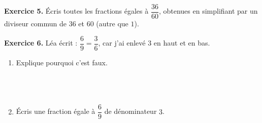 \vfill
{\bfseries\color{themeColor}Exercice 5.} Écris toutes les fractions égales à $\dfrac{36}{60}$, obtenues en simplifiant par un diviseur commun de $36$ et $60$ (autre que $1$).

\vspace{100pt}

\vfill
{\bfseries\color{themeColor}Exercice 6.} Léa écrit : $\dfrac{6}{9}=\dfrac{3}{6}$, car \og j'ai enlevé $3$ en haut et en bas\fg{}.
 
\begin{enumerate}[leftmargin=*,align=parleft, label=\alph*), itemsep=20pt]
\item Explique pourquoi c'est faux.\\
\bl[\linewidth]\\
\bl[\linewidth]\\
\bl[\linewidth]\\
\bl[\linewidth]
\item Écris une fraction égale à $\dfrac{6}{9}$ de dénominateur $3$.
\end{enumerate}

\vfill
\newpage
